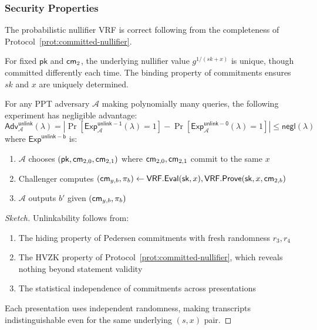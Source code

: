 \subsubsection{Security Properties}

\begin{theorem}[Correctness]
The probabilistic nullifier VRF is correct following from the completeness of Protocol~\ref{prot:committed-nullifier}.
\end{theorem}

\begin{theorem}[Uniqueness]
For fixed $\mathsf{pk}$ and $\mathsf{cm}_2$, the underlying nullifier value $g^{1/(sk + x)}$ is unique, though committed differently each time. The binding property of commitments ensures $sk$ and $x$ are uniquely determined.
\end{theorem}

\begin{theorem}[Unlinkability]
For any PPT adversary $\mathcal{A}$ making polynomially many queries, the following experiment has negligible advantage:
\[
\mathsf{Adv}^{\mathsf{unlink}}_{\mathcal{A}}(\lambda) = \left| \Pr[\mathsf{Exp}^{\mathsf{unlink-1}}_{\mathcal{A}}(\lambda) = 1] - \Pr[\mathsf{Exp}^{\mathsf{unlink-0}}_{\mathcal{A}}(\lambda) = 1] \right| \leq \mathsf{negl}(\lambda)
\]
where $\mathsf{Exp}^{\mathsf{unlink-b}}$ is:
\begin{enumerate}
    \item $\mathcal{A}$ chooses $(\mathsf{pk}, \mathsf{cm}_{2,0}, \mathsf{cm}_{2,1})$ where $\mathsf{cm}_{2,0}, \mathsf{cm}_{2,1}$ commit to the same $x$
    \item Challenger computes $(\mathsf{cm}_{y,b}, \pi_b) \leftarrow \mathsf{VRF.Eval}(\mathsf{sk}, x), \mathsf{VRF.Prove}(\mathsf{sk}, x, \mathsf{cm}_{2,b})$
    \item $\mathcal{A}$ outputs $b'$ given $(\mathsf{cm}_{y,b}, \pi_b)$
\end{enumerate}
\end{theorem}

\begin{proof}[Sketch]
Unlinkability follows from:
\begin{enumerate}
    \item The hiding property of Pedersen commitments with fresh randomness $r_3, r_4$
    \item The HVZK property of Protocol~\ref{prot:committed-nullifier}, which reveals nothing beyond statement validity
    \item The statistical independence of commitments across presentations
\end{enumerate}
Each presentation uses independent randomness, making transcripts indistinguishable even for the same underlying $(s, x)$ pair.
\end{proof}




















